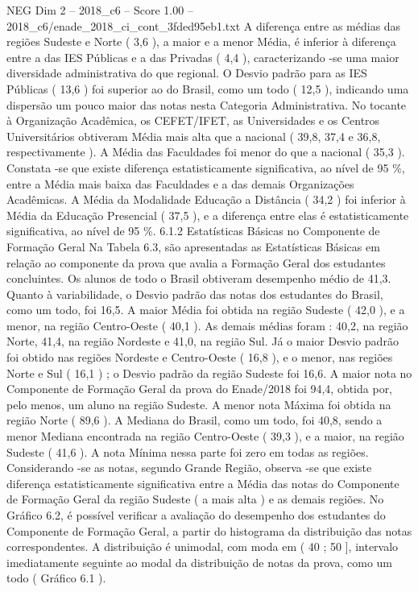 \begin{textsample}{NEG Dim 2 – 2018\_c6 – Score 1.00 – 2018\_c6/enade\_2018\_ci\_cont\_3fded95eb1.txt}
A diferença entre as médias das regiões Sudeste e Norte ( 3,6 ), a maior e a menor Média, é inferior à diferença entre a das IES Públicas e a das Privadas ( 4,4 ), caracterizando -se uma maior diversidade administrativa do que regional.
O Desvio padrão para as IES Públicas ( 13,6 ) foi superior ao do Brasil, como um todo ( 12,5 ), indicando uma dispersão um pouco maior das notas nesta Categoria Administrativa.
No tocante à Organização Acadêmica, os CEFET/IFET, as Universidades e os Centros Universitários obtiveram Média mais alta que a nacional ( 39,8, 37,4 e 36,8, respectivamente ).
A Média das Faculdades foi menor do que a nacional ( 35,3 ).
Constata -se que existe diferença estatisticamente significativa, ao nível de 95 \%, entre a Média mais baixa das Faculdades e a das demais Organizações Acadêmicas.
A Média da Modalidade Educação a Distância ( 34,2 ) foi inferior à Média da Educação Presencial ( 37,5 ), e a diferença entre elas é estatisticamente significativa, ao nível de 95 \%. 6.1.2 Estatísticas Básicas no Componente de Formação Geral Na Tabela 6.3, são apresentadas as Estatísticas Básicas em relação ao componente da prova que avalia a Formação Geral dos estudantes concluintes.
Os alunos de todo o Brasil obtiveram desempenho médio de 41,3.
Quanto à variabilidade, o Desvio padrão das notas dos estudantes do Brasil, como um todo, foi 16,5.
A maior Média foi obtida na região Sudeste ( 42,0 ), e a menor, na região Centro-Oeste ( 40,1 ).
As demais médias foram : 40,2, na região Norte, 41,4, na região Nordeste e 41,0, na região Sul.
Já o maior Desvio padrão foi obtido nas regiões Nordeste e Centro-Oeste ( 16,8 ), e o menor, nas regiões Norte e Sul ( 16,1 ) ; o Desvio padrão da região Sudeste foi 16,6.
A maior nota no Componente de Formação Geral da prova do Enade/2018 foi 94,4, obtida por, pelo menos, um aluno na região Sudeste.
A menor nota Máxima foi obtida na região Norte ( 89,6 ).
A Mediana do Brasil, como um todo, foi 40,8, sendo a menor Mediana encontrada na região Centro-Oeste ( 39,3 ), e a maior, na região Sudeste ( 41,6 ).
A nota Mínima nessa parte foi zero em todas as regiões.
Considerando -se as notas, segundo Grande Região, observa -se que existe diferença estatisticamente significativa entre a Média das notas do Componente de Formação Geral da região Sudeste ( a mais alta ) e as demais regiões.
No Gráfico 6.2, é possível verificar a avaliação do desempenho dos estudantes do Componente de Formação Geral, a partir do histograma da distribuição das notas correspondentes.
A distribuição é unimodal, com moda em ( 40 ; 50 ], intervalo imediatamente seguinte ao modal da distribuição de notas da prova, como um todo ( Gráfico 6.1 ).

\end{textsample}
